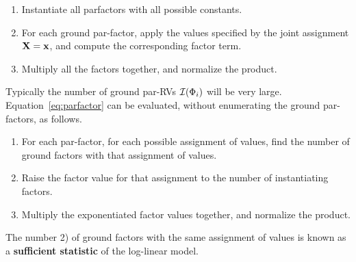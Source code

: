 \documentclass{IEEEtran}
\begin{document}
\begin{enumerate}
\item Instantiate all parfactors with all possible constants. 
\item For each ground par-factor, apply the values specified by the joint assignment  $\mathbf{X}=\mathbf{x}$, and compute the corresponding factor term.
\item Multiply all the factors together, and normalize the product.  
\end{enumerate}


Typically the number of ground par-RVs $\mathcal{I}(\Phi_{i})$ will be very large.  
Equation~\ref{eq:parfactor} can be evaluated, without enumerating the ground par-factors, 
as follows. 

\begin{enumerate}
\item For each par-factor, for each possible assignment of values, find the number of ground factors with that assignment of values.
\item Raise the factor value for that assignment to the number of instantiating factors.
\item Multiply the exponentiated factor values together, and normalize the product. 
\end{enumerate}

The number 2) of ground factors with the same assignment of values is known as a \textbf{sufficient statistic} of the log-linear model. 
\end{document}
